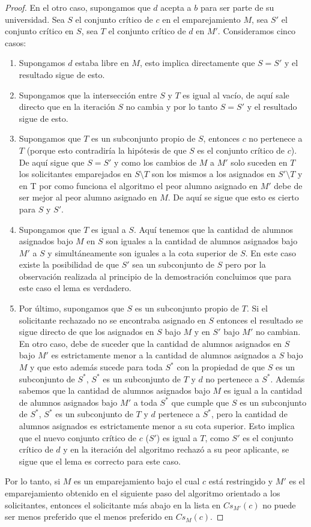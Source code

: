\begin{proof}
En el otro caso, supongamos que $d$ acepta a $b$ para ser parte de su universidad. Sea $S$ el conjunto crítico de $c$ en el emparejamiento $M$, sea $S'$ el conjunto crítico en $S$, sea $T$ el conjunto crítico de $d$ en $M'$. Consideramos cinco casos:
\begin{enumerate}
\item Supongamos $d$ estaba libre en $M$, esto implica directamente que $S=S'$ y el resultado sigue de esto.
\item Supongamos que la intersección entre $S$ y $T$ es igual al vacío, de aquí sale directo que en la iteración $S$ no cambia y por lo tanto $S=S'$ y el resultado sigue de esto.
\item Supongamos que $T$ es un subconjunto propio de $S$, entonces $c$ no pertenece a $T$ (porque esto contradiría la hipótesis de que $S$ es el conjunto crítico de $c$). De aquí sigue que $S=S'$ y como los cambios de $M$  a $M'$ solo suceden en $T$ los solicitantes emparejados en $S\setminus T$ son los mismos a los asignados en $S' \setminus T$ y en T por como funciona el algoritmo el peor alumno asignado en $M'$ debe de ser mejor al peor alumno asignado en $M$. De aquí se sigue que esto es cierto para $S$ y $S'$.
\item Supongamos que $T$ es igual a $S$. Aquí tenemos que la cantidad de alumnos asignados bajo $M$ en $S$ son iguales a la cantidad de alumnos asignados bajo $M'$ a $S$ y simultáneamente son iguales a la cota superior de $S$. En este caso existe la posibilidad de que $S'$ sea un subconjunto de $S$ pero por la observación realizada al principio de la demostración concluimos que para este caso el lema es verdadero.
\item Por último, supongamos que $S$ es un subconjunto propio de $T$. Si el solicitante rechazado no se encontraba asignado en $S$ entonces el resultado se sigue directo de que los asignados en $S$ bajo $M$ y en $S'$ bajo $M'$ no cambian. En otro caso, debe de suceder que la cantidad de alumnos asignados en $S$ bajo $M'$ es estrictamente menor a la cantidad de alumnos asignados a $S$ bajo $M$ y que esto además sucede para toda $S^*$ con la propiedad de que $S$ es un subconjunto de $S^*$, $S^*$ es un subconjunto de $T$ y $d$ no pertenece a $S^*$. Además sabemos que la cantidad de alumnos asignados bajo $M$ es igual a la cantidad de alumnos asignados bajo $M'$ a toda $S^*$ que cumple que $S$ es un subconjunto de $S^*$, $S^*$ es un subconjunto de $T$ y $d$ pertenece a $S^*$, pero la cantidad de alumnos asignados es estrictamente menor a su cota superior.  Esto implica que el nuevo conjunto crítico de $c$ ($S'$) es igual a $T$, como $S'$ es el conjunto crítico de $d$ y en la iteración del algoritmo rechazó a su peor aplicante, se sigue que el lema es correcto para este caso. 
\end{enumerate}
Por lo tanto, si $M$ es un emparejamiento bajo el cual $c$ está restringido y $M'$ es el emparejamiento obtenido en el siguiente paso del algoritmo orientado a los solicitantes, entonces el solicitante más abajo en la lista en  $Cs_{M'}(c)$ no puede ser menos preferido que el menos preferido en $Cs_M(c)$.
\end{proof}

